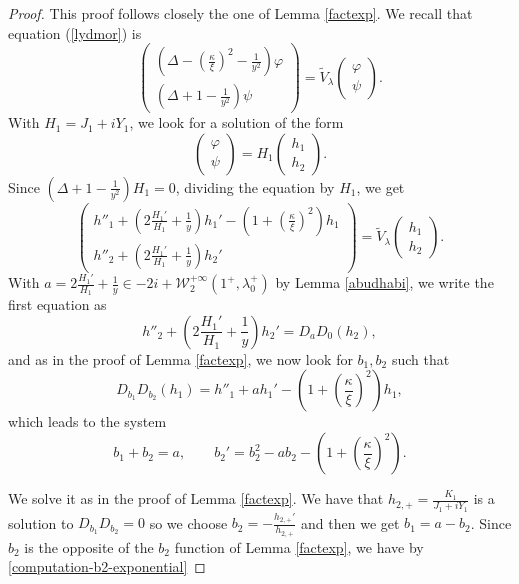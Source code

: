 \documentclass[11 pt]{amsart}
\theoremstyle{definition}
\theoremstyle{remark}
\numberwithin{equation}{section}
\begin{document}
\begin{proof}
  This proof follows closely the one of Lemma \ref{factexp}. We recall that
  equation (\ref{lydmor}) is
  \[ \left(\begin{array}{c}
       \left( \Delta - \left( \frac{\kappa}{\xi} \right)^2 - \frac{1}{y^2}
       \right) \varphi\\
       \left( \Delta + 1 - \frac{1}{y^2} \right) \psi
     \end{array}\right) = \widetilde{V}_{\lambda} \left(\begin{array}{c}
       \varphi\\
       \psi
     \end{array}\right) . \]
  With $H_1 = J_1 + i Y_1$, we look for a solution of the form
  \[ \left(\begin{array}{c}
       \varphi\\
       \psi
     \end{array}\right) = H_1 \left(\begin{array}{c}
       h_1\\
       h_2
     \end{array}\right) . \]
  Since $\left( \Delta + 1 - \frac{1}{y^2} \right) H_1 = 0$,
  dividing the equation by $H_1$, we get
  \[ \left(\begin{array}{c}
       h''_1 + \left( 2 \frac{H_1'}{H_1} + \frac{1}{y} \right) h_1' - \left( 1
       + \left( \frac{\kappa}{\xi} \right)^2 \right) h_1\\
       h''_2 + \left( 2 \frac{H_1'}{H_1} + \frac{1}{y} \right) h_2'
     \end{array}\right) = \widetilde{V}_{\lambda} \left(\begin{array}{c}
       h_1\\
       h_2
     \end{array}\right) . \]
  With $a = 2 \frac{H_1'}{H_1} + \frac{1}{y} \in -2i+ \mathcal{W}^{+
  \infty}_2 (1^+,\lambda_0^+)$ by Lemma \ref{abudhabi}, we write the first equation as
  \[ h''_2 + \left( 2 \frac{H_1'}{H_1} + \frac{1}{y} \right) h_2' = D_a D_0
     (h_2), \]
  and as in the proof of Lemma \ref{factexp}, we now look for $b_1, b_2$ such
  that
  \[ D_{b_1} D_{b_2} (h_1) = h''_1 + a h_1' - \left( 1 + \left(
     \frac{\kappa}{\xi} \right)^2 \right) h_1, \]
  which leads to the system
  \[ b_1 + b_2 = a, \qquad b_2' = b_2^2 - a b_2 - \left( 1 + \left(
     \frac{\kappa}{\xi} \right)^2 \right) . \]

We solve it as in the proof of Lemma \ref{factexp}. We have that $h_{2,+}=\frac{K_1}{J_1+iY_1}$ is a solution to $D_{b_1}D_{b_2}=0$ so we choose $b_2=-\frac{h_{2,+}'}{h_{2,+}}$ and then we get $b_1=a-b_2$. Since $b_2$ is the opposite of the $b_2$ function of Lemma \ref{factexp}, we have by \eqref{computation-b2-exponential}


\end{proof}
\end{document}
